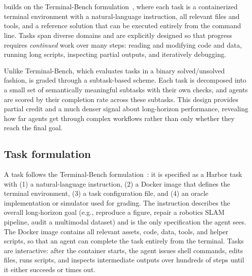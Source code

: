 \section{\ours{}}
\label{sec:background}

\ours{} builds on the Terminal-Bench formulation~\cite{merrill2026terminalbenchbenchmarkingagentshard}, where each task is a containerized terminal environment with a natural-language instruction, all relevant files and tools, and a reference solution that can be executed entirely from the command line.
Tasks span diverse domains and are explicitly designed so that progress requires \emph{continued} work over many steps: reading and modifying code and data, running long scripts, inspecting partial outputs, and iteratively debugging.

Unlike Terminal-Bench, which evaluates tasks in a binary solved/unsolved fashion, \ours{} is graded through a subtask-based scheme.
Each task is decomposed into a small set of semantically meaningful subtasks with their own checks, and agents are scored by their completion rate across these subtasks.
This design provides partial credit and a much denser signal about long-horizon performance, revealing how far agents get through complex workflows rather than only whether they reach the final goal.


\subsection{Task formulation}

A \ours{} task follows the Terminal-Bench formulation~\cite{merrill2026terminalbenchbenchmarkingagentshard}: it is specified as a Harbor task with (1) a natural-language instruction, (2) a Docker image that defines the terminal environment, (3) a task configuration file, and (4) an oracle implementation or simulator used for grading.
The instruction describes the overall long-horizon goal (e.g., reproduce a figure, repair a robotics SLAM pipeline, audit a multimodal dataset) and is the only specification the agent sees.
%
The Docker image contains all relevant assets, code, data, tools, and helper scripts, so that an agent can complete the task entirely from the terminal.
%
Tasks are interactive: after the container starts, the agent issues shell commands, edits files, runs scripts, and inspects intermediate outputs over hundreds of steps until it either succeeds or times out.

